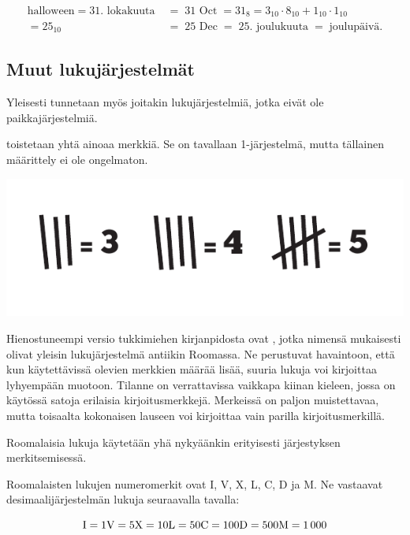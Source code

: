 \begin{align*}
	\text{halloween} \; = \; \text{31. lokakuuta} \; &= \; \text{31 Oct} \; = 31_8 = 3_{10} \cdot 8_{10} + 1_{10} \cdot 1_{10} \\
	= {25}_{10} &= \; \text{25 Dec} \; = \; \text{25. joulukuuta} \; = \; \text{joulupäivä.}
\end{align*}

\subsection*{Muut lukujärjestelmät}

Yleisesti tunnetaan myös joitakin lukujärjestelmiä, jotka eivät ole paikkajärjestelmiä.

 toistetaan yhtä ainoaa merkkiä. Se on tavallaan 1-järjestelmä, mutta tällainen määrittely ei ole ongelmaton.

\begin{center}
	\includegraphics{pictures/Kuva1-1-tukkimiehenkirjanpito.pdf}
\end{center}

Hienostuneempi versio tukkimiehen kirjanpidosta ovat , jotka nimensä mukaisesti olivat yleisin lukujärjestelmä antiikin Roomassa. Ne perustuvat havaintoon, että kun käytettävissä olevien merkkien määrää lisää, suuria lukuja voi kirjoittaa lyhyempään muotoon. Tilanne on verrattavissa vaikkapa kiinan kieleen, jossa on käytössä satoja erilaisia kirjoitusmerkkejä. Merkeissä on paljon muistettavaa, mutta toisaalta kokonaisen lauseen voi kirjoittaa vain parilla kirjoitusmerkillä.

Roomalaisia lukuja käytetään yhä nykyäänkin erityisesti järjestyksen merkitsemisessä.

Roomalaisten lukujen numeromerkit ovat I, V, X, L, C, D ja M. Ne vastaavat desimaalijärjestelmän lukuja seuraavalla tavalla:

\begin{equation*}
	\rm I=1
	V=5
	X=10
	L=50
	C=100
	D=500
	M=1\,000
\end{equation*}


